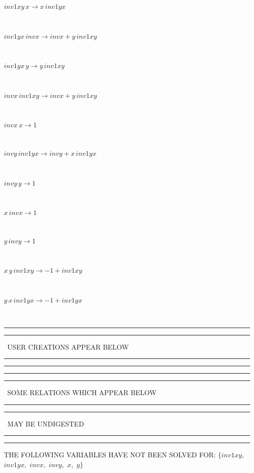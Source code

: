 \documentclass[rep10,leqno]{report}
\begin{document}
\begin{minipage}{6in}
$
inv1xy\,
 x\rightarrow x\,
 inv1yx
$
\end{minipage}\medskip \\
\begin{minipage}{6in}
$
inv1yx\,
 invx\rightarrow invx + y\,
 inv1xy
$
\end{minipage}\medskip \\
\begin{minipage}{6in}
$
inv1yx\,
 y\rightarrow y\,
 inv1xy
$
\end{minipage}\medskip \\
\begin{minipage}{6in}
$
invx\,
 inv1xy\rightarrow invx + y\,
 inv1xy
$
\end{minipage}\medskip \\
\begin{minipage}{6in}
$
invx\,
 x\rightarrow 1
$
\end{minipage}\medskip \\
\begin{minipage}{6in}
$
invy\,
 inv1yx\rightarrow invy + x\,
 inv1yx
$
\end{minipage}\medskip \\
\begin{minipage}{6in}
$
invy\,
 y\rightarrow 1
$
\end{minipage}\medskip \\
\begin{minipage}{6in}
$
x\,
 invx\rightarrow 1
$
\end{minipage}\medskip \\
\begin{minipage}{6in}
$
y\,
 invy\rightarrow 1
$
\end{minipage}\medskip \\
\begin{minipage}{6in}
$
x\,
 y\,
 inv1xy\rightarrow -1 + inv1xy
$
\end{minipage}\medskip \\
\begin{minipage}{6in}
$
y\,
 x\,
 inv1yx\rightarrow -1 + inv1yx
$
\end{minipage}\\
\rule[2pt]{6in}{1pt}\hfil\break
\rule[2.5pt]{1.701in}{1pt}
\ USER CREATIONS APPEAR BELOW\ 
\rule[2.5pt]{1.701in}{1pt}\hfil\break
\rule[2pt]{6in}{1pt}\hfil\break
\rule[2pt]{6in}{4pt}\hfil\break
\rule[2pt]{1.45in}{4pt}
\ SOME RELATIONS WHICH APPEAR BELOW\ 
\rule[2pt]{1.45in}{4pt}\hfil\break
\rule[2pt]{2.18in}{4pt}
\ MAY BE UNDIGESTED\ 
\rule[2pt]{2.18in}{4pt}\hfil\break
\rule[2pt]{6in}{4pt}\hfil\break
THE FOLLOWING VARIABLES HAVE NOT BEEN SOLVED FOR:\hfil\break
$\{inv1xy,
$ $
inv1yx,
$ $
invx,
$ $
invy,
$ $
x,
$ $
y\}$
\smallskip\\
\vspace{10pt}
\end{document}
